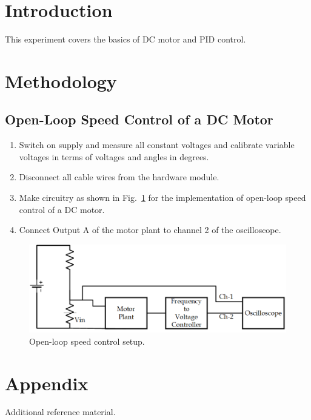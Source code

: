 \documentclass[11pt,twoside]{SEEELab_V1}
\begin{document}
\makelabtitle
\makemargintoc

\section{Introduction}
This experiment covers the basics of DC motor and PID control.

\section{Methodology}
\subsection{Open-Loop Speed Control of a DC Motor}
\begin{enumerate}
  \item Switch on supply and measure all constant voltages and calibrate variable voltages in terms of voltages and angles in degrees.
  \item Disconnect all cable wires from the hardware module.
  \item Make circuitry as shown in Fig.~\ref{fig:openloop} for the implementation of open-loop speed control of a DC motor.
  \item Connect Output A of the motor plant to channel 2 of the oscilloscope.
\end{enumerate}

\begin{figure}[ht]
  \centering
  \includegraphics[width=0.9\linewidth]{OpenLoopMotorControl.png}
  \caption{Open-loop speed control setup.\label{fig:openloop}}
\end{figure}

\appendix
\section{Appendix}
Additional reference material.
\end{document}
